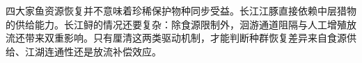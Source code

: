 四大家鱼资源恢复并不意味着珍稀保护物种同步受益。长江江豚直接依赖中层猎物的供给能力。长江鲟的情况还要复杂：除食源限制外，洄游通道阻隔与人工增殖放流还带来双重影响。只有厘清这两类驱动机制，才能判断种群恢复差异来自食源供给、江湖连通性还是放流补偿效应。
